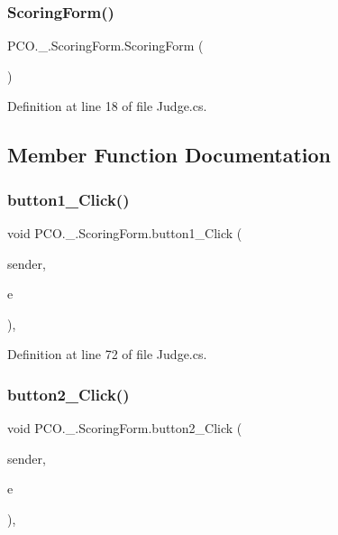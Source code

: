 \subsubsection{\texorpdfstring{Scoring\+Form()}{ScoringForm()}}
{\footnotesize\ttfamily P\+C\+O.\+\_.\+Scoring\+Form.\+Scoring\+Form (\begin{DoxyParamCaption}{ }\end{DoxyParamCaption})\hspace{0.3cm}{\ttfamily [inline]}}



Definition at line 18 of file Judge.\+cs.



\subsection{Member Function Documentation}
\mbox{\label{classPCO_1_1__0_1_1ScoringForm_ac1be33466917df2d76628a4d302df722}} 
\subsubsection{\texorpdfstring{button1\+\_\+\+Click()}{button1\_Click()}}
{\footnotesize\ttfamily void P\+C\+O.\+\_.\+Scoring\+Form.\+button1\+\_\+\+Click (\begin{DoxyParamCaption}\item[{object}]{sender,  }\item[{Event\+Args}]{e }\end{DoxyParamCaption})\hspace{0.3cm}{\ttfamily [inline]}, {\ttfamily [private]}}



Definition at line 72 of file Judge.\+cs.

\mbox{\label{classPCO_1_1__0_1_1ScoringForm_a21264de2ba76e68e25c938d893ab8f6d}} 
\subsubsection{\texorpdfstring{button2\+\_\+\+Click()}{button2\_Click()}}
{\footnotesize\ttfamily void P\+C\+O.\+\_.\+Scoring\+Form.\+button2\+\_\+\+Click (\begin{DoxyParamCaption}\item[{object}]{sender,  }\item[{Event\+Args}]{e }\end{DoxyParamCaption})\hspace{0.3cm}{\ttfamily [inline]}, {\ttfamily [private]}}



